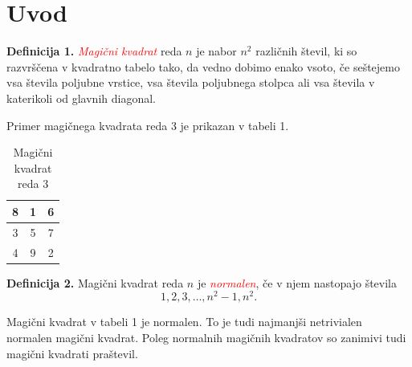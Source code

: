 \documentclass[a4paper,12pt]{article}
\begin{document}
\newpage

\section{Uvod}

   \textbf{Definicija 1.} \textcolor{red}{\emph{Magični kvadrat}} reda $n$ je nabor $n^2$ različnih števil,
   ki so razvrščena v kvadratno tabelo tako, da vedno dobimo enako vsoto,
   če seštejemo vsa števila poljubne vrstice, vsa števila poljubnega
   stolpca ali vsa števila v katerikoli od glavnih diagonal.

Primer magičnega kvadrata reda 3 je prikazan v tabeli 1.
\begin{table}[h]
   \begin{center}

   \caption{Magični kvadrat reda 3}
   \label{table:mag3}
   \begin{tabular}{|c|c|c|}
   \hline
   8 & 1 & 6 \\ \hline
   3 & 5 & 7 \\ \hline
   4 & 9 & 2 \\ \hline
   \end{tabular}
         
   \end{center}
\end{table}


\textbf{Definicija 2.} Magični kvadrat reda $n$ je \textcolor{red}{\emph{normalen}}, če v njem nastopajo števila
   \begin{equation}
      1, 2, 3, \ldots, n^2-1, n^2.
   \end{equation}

Magični kvadrat v tabeli 1 je normalen.
To je tudi najmanjši netrivialen normalen magični kvadrat.
Poleg normalnih magičnih kvadratov so zanimivi tudi magični kvadrati praštevil.
\end{document}
